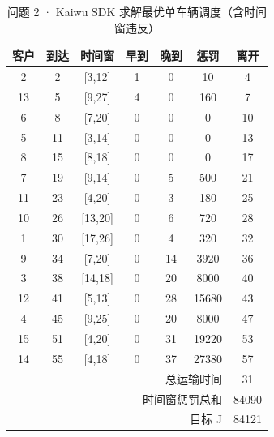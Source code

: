 \begin{table}[htbp]
\centering
\caption{问题 2 · Kaiwu SDK 求解最优单车辆调度（含时间窗违反）}\label{tab:q2_kaiwu_schedule}
\begin{tabular}{ccccccc}
\toprule
客户 & 到达 & 时间窗 & 早到 & 晚到 & 惩罚 & 离开 \\
\midrule
2 & 2 & [3,12] & 1 & 0 & 10 & 4 \\
13 & 5 & [9,27] & 4 & 0 & 160 & 7 \\
6 & 8 & [7,20] & 0 & 0 & 0 & 10 \\
5 & 11 & [3,14] & 0 & 0 & 0 & 13 \\
8 & 15 & [8,18] & 0 & 0 & 0 & 17 \\
7 & 19 & [9,14] & 0 & 5 & 500 & 21 \\
11 & 23 & [4,20] & 0 & 3 & 180 & 25 \\
10 & 26 & [13,20] & 0 & 6 & 720 & 28 \\
1 & 30 & [17,26] & 0 & 4 & 320 & 32 \\
9 & 34 & [7,20] & 0 & 14 & 3920 & 36 \\
3 & 38 & [14,18] & 0 & 20 & 8000 & 40 \\
12 & 41 & [5,13] & 0 & 28 & 15680 & 43 \\
4 & 45 & [9,25] & 0 & 20 & 8000 & 47 \\
15 & 51 & [4,20] & 0 & 31 & 19220 & 53 \\
14 & 55 & [4,18] & 0 & 37 & 27380 & 57 \\
\midrule
\multicolumn{6}{r}{总运输时间} & 31 \\
\multicolumn{6}{r}{时间窗惩罚总和} & 84090 \\
\multicolumn{6}{r}{目标 J} & 84121 \\
\bottomrule
\end{tabular}
\end{table}
